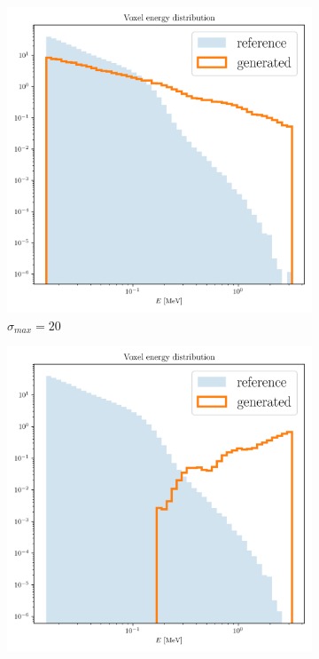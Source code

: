 \begin{figure}
    \centering
    \begin{subfigure}[b]{0.23\textwidth}
        \centering
        \includegraphics[width=\textwidth]{Figures/vp20_7.png}
        \caption{$\sigma_{max}=20$}
        \label{fig:vp20_7}
    \end{subfigure}
    \hfill
    \begin{subfigure}[b]{0.23\textwidth}
        \centering
        \includegraphics[width=\textwidth]{Figures/vp10_7.png}

\end{subfigure}
\end{figure}
